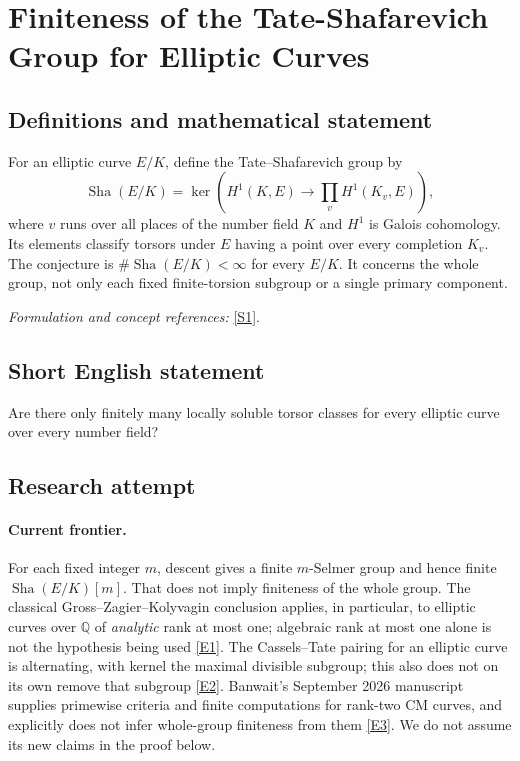 \documentclass[11pt,a4paper]{article}
\newcommand{\Q}{\mathbb{Q}}
\newcommand{\sref}[2]{\hyperlink{source:#1:#2}{[S#2]}}
\newcommand{\eref}[2]{\hyperlink{extra:#1:#2}{[E#2]}}
\newif\ifshowcatalogue
\newcommand{\cataloguescope}[1]{\ifshowcatalogue
 \paragraph{Exact scope in the supplied catalogue.}
 \begin{quote}\small #1\end{quote}\fi}
\numberwithin{equation}{section}
\begin{document}
\setcounter{section}{0}
\clearpage
\section*{\texorpdfstring{Finiteness of the Tate-Shafarevich Group for Elliptic Curves}{Finiteness of the Tate-Shafarevich Group for Elliptic Curves}}\label{statement}
\subsection{Definitions and mathematical statement}
For an elliptic curve $E/K$, define the Tate--Shafarevich group by
\[
 \operatorname{Sha}(E/K)=\ker\!\left(H^1(K,E)\longrightarrow\prod_v H^1(K_v,E)\right),
\]
where $v$ runs over all places of the number field $K$ and $H^1$ is Galois cohomology. Its elements classify torsors under $E$ having a point over every completion $K_v$. The conjecture is $\#\operatorname{Sha}(E/K)<\infty$ for every $E/K$. It concerns the whole group, not only each fixed finite-torsion subgroup or a single primary component.
\par\smallskip\textit{Formulation and concept references:} \sref{statement}{1}.
\cataloguescope{Prove that the Tate-Shafarevich group Sha(E/K) is finite for every elliptic curve E defined over a number field K.}
\subsection{Short English statement}
Are there only finitely many locally soluble torsor classes for every elliptic curve over every number field?
\subsection{Research attempt}

\paragraph{Current frontier.}
For each fixed integer $m$, descent gives a finite $m$-Selmer group and hence finite $\operatorname{Sha}(E/K)[m]$. That does not imply finiteness of the whole group. The classical Gross--Zagier--Kolyvagin conclusion applies, in particular, to elliptic curves over $\Q$ of \emph{analytic} rank at most one; algebraic rank at most one alone is not the hypothesis being used \eref{statement}{1}. The Cassels--Tate pairing for an elliptic curve is alternating, with kernel the maximal divisible subgroup; this also does not on its own remove that subgroup \eref{statement}{2}. Banwait's September 2026 manuscript supplies primewise criteria and finite computations for rank-two CM curves, and explicitly does not infer whole-group finiteness from them \eref{statement}{3}. We do not assume its new claims in the proof below.
\end{document}
